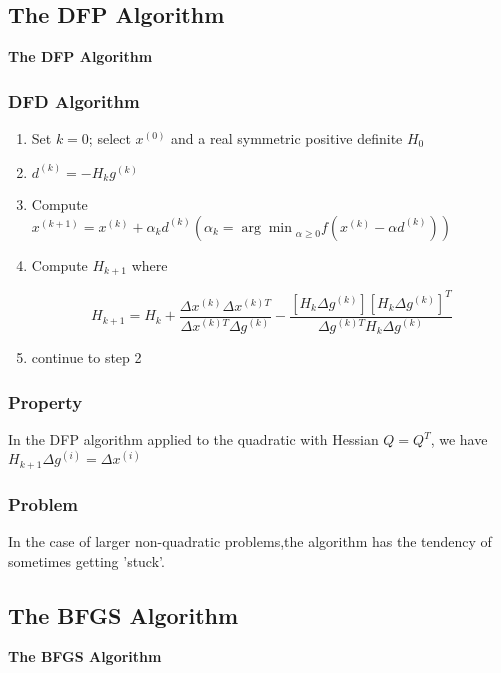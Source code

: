 \begin{frame}
	\section{The DFP Algorithm}
	\begin{center}
	\begin{Huge}
	\textbf{The DFP Algorithm}
	\end{Huge}
	\end{center}
\end{frame}

\begin{frame}
	\frametitle{DFD Algorithm}
	\begin{enumerate}
	\item Set $k = 0$; select $x^{(0)}$ and a real symmetric positive definite $H_0$
	\item $d^{(k)} = -H_kg^{(k)}$
	\item Compute $x^{(k+1)} = x^{(k)} + \alpha_k d^{(k)} (\alpha_k = {\arg\min}_{\alpha \geq 0} f(x^{(k)} - \alpha d^{(k)}))$
	\item Compute $H_{k+1}$ where
	
	$$H_{k+1} = H_k + \dfrac{\Delta x^{(k)}\Delta x^{(k)T}}{\Delta x^{(k)T}\Delta g^{(k)}} - \dfrac{[H_k\Delta g^{(k)}][H_k \Delta g^{(k)}]^T}{\Delta g^{(k)T}H_k\Delta g^{(k)}}$$
	\item continue to step 2
	\end{enumerate}
\end{frame}

\begin{frame}
	\frametitle{Property}
	
	In the DFP algorithm applied to the quadratic with Hessian $Q = Q^T$, we have $H_{k+1}\Delta g^{(i)} = \Delta x^{(i)}$
\end{frame}


\begin{frame}
	\frametitle{Problem}
	
	In the case of larger non-quadratic problems,the algorithm has the tendency of sometimes getting 'stuck'.
\end{frame}

\begin{frame}
	\section{The BFGS Algorithm}
	\begin{center}
	\begin{Huge}
	\textbf{The BFGS Algorithm}
	\end{Huge}
	\end{center}
\end{frame}

